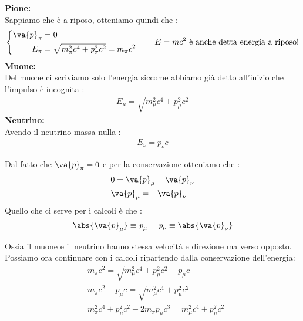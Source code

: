 \documentclass[a4paper, 12pt, twoside]{report}
\begin{document}
\textbf{Pione:} \\
Sappiamo che è a riposo, otteniamo quindi che : 
\begin{equation*}
        \left\{ \begin{aligned}
                        \va{p}_{\pi} &= 0 \\
                        E_{\pi} &= \sqrt{m^2_{\pi}c^4 + \textit{p}_{\pi}^2c^2} = m_{\pi}c^2 
                \end{aligned}
                \right.
                \qquad \text{$E=mc^2$ è anche detta energia a riposo!}
\end{equation*}
\textbf{Muone:}\\
Del muone ci scriviamo solo l'energia siccome abbiamo già detto all'inizio che l'impulso è incognita : 
\begin{align*}
    E_{\mu} = \sqrt{m_{\mu}^2c^4 + \textit{p}_{\mu}^2c^2}
\end{align*}
\textbf{Neutrino:}\\
Avendo il neutrino massa nulla : 
\begin{align*}
    E_{\nu} = \textit{p}_{\nu}c
\end{align*}
\begin{tcolorbox}[colback=red!5!white,colframe=red!50!black,title=ATTENZIONE !]
        Dal fatto che $\va{p}_{\pi} = 0$ e per la conservazione otteniamo che : 
        \begin{align*}
                &0 = \va{p}_{\mu} + \va{p}_{\nu} \\
                &\va{p}_{\mu} = -\va{p}_{\nu} 
        \end{align*}
        Quello che ci serve per i calcoli è che : 
        \begin{align*}
            \abs{\va{p}_{\mu}} \equiv \textit{p}_{\mu} = \textit{p}_{\nu} \equiv \abs{\va{p}_{\nu}}
        \end{align*}
\end{tcolorbox}
Ossia il muone e il neutrino hanno stessa velocità e direzione ma verso opposto. \\
Possiamo ora continuare con i calcoli ripartendo dalla conservazione dell'energia: 
\begin{align*}
        &m_{\pi}c^2 = \sqrt{m_{\mu}^2c^4 + \textit{p}_{\mu}^2c^2} + \textit{p}_{\mu}c\\
        &m_{\pi}c^2 - \textit{p}_{\mu}c =\sqrt{m_{\mu}^2c^4 +\textit{p}_{\mu}^2c^2 }\\ 
        &m_{\pi}^2c^4 + \textit{p}_{\mu}^2c^2 - 2m_{\pi}\textit{p}_{\mu}c^3 = m_{\mu}^2c^4 +\textit{p}_{\mu}^2c^2
\end{align*}
\end{document}
